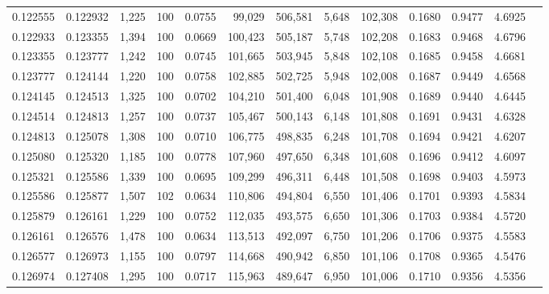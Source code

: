 \begin{tabular}{rrrrrrrrrrrrr}
0.122555 & 0.122932 & 1,225 & 100 &                                     0.0755 &  99,029 & 506,581 &   5,648 & 102,308 & 0.1680 & 0.9477 & 4.6925 \\
0.122933 & 0.123355 & 1,394 & 100 &                                     0.0669 & 100,423 & 505,187 &   5,748 & 102,208 & 0.1683 & 0.9468 & 4.6796 \\
0.123355 & 0.123777 & 1,242 & 100 &                                     0.0745 & 101,665 & 503,945 &   5,848 & 102,108 & 0.1685 & 0.9458 & 4.6681 \\
0.123777 & 0.124144 & 1,220 & 100 &                                     0.0758 & 102,885 & 502,725 &   5,948 & 102,008 & 0.1687 & 0.9449 & 4.6568 \\
0.124145 & 0.124513 & 1,325 & 100 &                                     0.0702 & 104,210 & 501,400 &   6,048 & 101,908 & 0.1689 & 0.9440 & 4.6445 \\
0.124514 & 0.124813 & 1,257 & 100 &                                     0.0737 & 105,467 & 500,143 &   6,148 & 101,808 & 0.1691 & 0.9431 & 4.6328 \\
0.124813 & 0.125078 & 1,308 & 100 &                                     0.0710 & 106,775 & 498,835 &   6,248 & 101,708 & 0.1694 & 0.9421 & 4.6207 \\
0.125080 & 0.125320 & 1,185 & 100 &                                     0.0778 & 107,960 & 497,650 &   6,348 & 101,608 & 0.1696 & 0.9412 & 4.6097 \\
0.125321 & 0.125586 & 1,339 & 100 &                                     0.0695 & 109,299 & 496,311 &   6,448 & 101,508 & 0.1698 & 0.9403 & 4.5973 \\
0.125586 & 0.125877 & 1,507 & 102 &                                     0.0634 & 110,806 & 494,804 &   6,550 & 101,406 & 0.1701 & 0.9393 & 4.5834 \\
0.125879 & 0.126161 & 1,229 & 100 &                                     0.0752 & 112,035 & 493,575 &   6,650 & 101,306 & 0.1703 & 0.9384 & 4.5720 \\
0.126161 & 0.126576 & 1,478 & 100 &                                     0.0634 & 113,513 & 492,097 &   6,750 & 101,206 & 0.1706 & 0.9375 & 4.5583 \\
0.126577 & 0.126973 & 1,155 & 100 &                                     0.0797 & 114,668 & 490,942 &   6,850 & 101,106 & 0.1708 & 0.9365 & 4.5476 \\
0.126974 & 0.127408 & 1,295 & 100 &                                     0.0717 & 115,963 & 489,647 &   6,950 & 101,006 & 0.1710 & 0.9356 & 4.5356 \\

\end{tabular}
